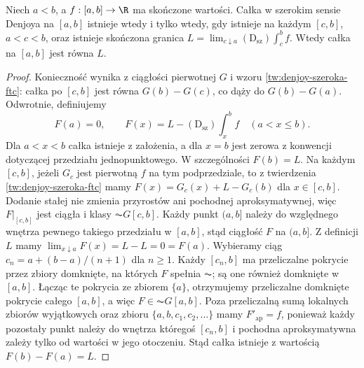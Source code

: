 \begin{twierdzenie}\label{ma1:kh:thm:wide-denjoy-hake}
Niech $a<b$, a $f:[a,b]\to\R$ ma skończone wartości. Całka w szerokim sensie Denjoya na $[a,b]$ istnieje wtedy i tylko wtedy, gdy istnieje na każdym $[c,b]$, $a<c<b$, oraz istnieje skończona granica
$L=\lim_{c\downarrow a}(\mathrm D_{\mathrm{sz}})\int_c^b f$.
Wtedy całka na $[a,b]$ jest równa $L$.
\end{twierdzenie}
\begin{proof}
Konieczność wynika z ciągłości pierwotnej $G$ i wzoru \ref{tw:denjoy-szeroka-ftc}: całka po $[c,b]$ jest równa $G(b)-G(c)$, co dąży do $G(b)-G(a)$. Odwrotnie, definiujemy
\[
 F(a)=0,\qquad
 F(x)=L-(\mathrm D_{\mathrm{sz}})\int_x^b f
 \quad(a<x\le b).
\]
Dla $a<x<b$ całka istnieje z założenia, a dla $x=b$
jest zerowa z konwencji dotyczącej przedziału
jednopunktowego. W szczególności $F(b)=L$. Na każdym $[c,b]$, jeżeli $G_c$ jest pierwotną $f$ na tym podprzedziale, to z twierdzenia \ref{tw:denjoy-szeroka-ftc} mamy $F(x)=G_c(x)+L-G_c(b)$ dla $x\in[c,b]$. Dodanie stałej nie zmienia przyrostów ani pochodnej
aproksymatywnej, więc $F|_{[c,b]}$ jest ciągła i klasy
$\AC G[c,b]$. Każdy punkt $(a,b]$ należy do względnego
wnętrza pewnego takiego przedziału w $[a,b]$, stąd
ciągłość $F$ na $(a,b]$. Z definicji $L$ mamy
$\lim_{x\downarrow a}F(x)=L-L=0=F(a)$.
Wybieramy ciąg $c_n=a+(b-a)/(n+1)$ dla $n\ge1$. Każdy $[c_n,b]$ ma przeliczalne pokrycie przez zbiory domknięte, na których $F$ spełnia $\AC$; są one również domknięte w $[a,b]$. Łącząc te pokrycia ze zbiorem $\{a\}$, otrzymujemy przeliczalne domknięte pokrycie całego $[a,b]$, a więc $F\in\AC G[a,b]$. Poza przeliczalną sumą lokalnych zbiorów wyjątkowych oraz zbioru $\{a,b,c_1,c_2,\ldots\}$ mamy $F'_{\mathrm{ap}}=f$, ponieważ każdy pozostały punkt należy do wnętrza któregoś $[c_n,b]$ i pochodna aproksymatywna zależy tylko od wartości w jego otoczeniu. Stąd całka istnieje z wartością $F(b)-F(a)=L$.
\end{proof}

